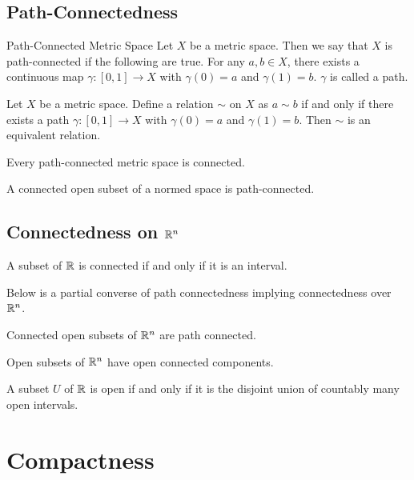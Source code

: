 \documentclass[a4paper]{article}
\begin{document}
\subsection{Path-Connectedness}
\begin{defn}{Path-Connected Metric Space}{} Let $X$ be a metric space. Then we say that $X$ is path-connected if the following are true. For any $a,b\in X$, there exists a continuous map $\gamma:[0,1]\to X$ with $\gamma(0)=a$ and $\gamma(1)=b$. $\gamma$ is called a path. 
\end{defn}

\begin{lmm}{}{} Let $X$ be a metric space. Define a relation $\sim$ on $X$ as $a\sim b$ if and only if there exists a path $\gamma:[0,1]\to X$ with $\gamma(0)=a$ and $\gamma(1)=b$. Then $\sim$ is an equivalent relation. 
\end{lmm}

\begin{prp}{}{} Every path-connected metric space is connected. 
\end{prp}

\begin{prp}{}{} A connected open subset of a normed space is path-connected. 
\end{prp}

\subsection{Connectedness on $\mathbb{R}^n$}
\begin{thm}{}{} A subset of $\mathbb{R}$ is connected if and only if it is an interval. 
\end{thm}

Below is a partial converse of path connectedness implying connectedness over $\mathbb{R}^n$. 

\begin{thm}{}{} Connected open subsets of $\mathbb{R}^n$ are path connected. 
\end{thm}

\begin{thm}{}{} Open subsets of $\mathbb{R}^n$ have open connected components. 
\end{thm}

\begin{thm}{}{} A subset $U$ of $\mathbb{R}$ is open if and only if it is the disjoint union of countably many open intervals. 
\end{thm}

\pagebreak
\section{Compactness}
\end{document}
